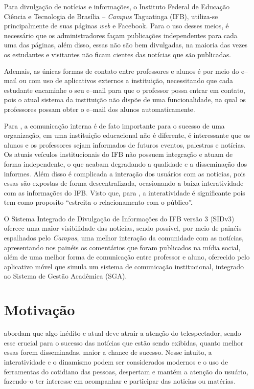 Para divulgação de notícias e informações, o Instituto Federal de Educação Ciência e Tecnologia de Brasília -- \textit{Campus} Taguatinga (IFB), utiliza-se principalmente de suas páginas \textit{web} e Facebook. Para o uso desses meios, é necessário que os administradores façam publicações independentes para cada uma das páginas, além disso, essas não são bem divulgadas, na maioria das vezes os estudantes e visitantes não ficam cientes das notícias que são publicadas. 

Ademais, as únicas formas de contato entre professores e alunos é por meio do e--mail ou com uso de aplicativos externos a instituição, necessitando que cada estudante encaminhe o seu e--mail para que o professor possa entrar em contato, pois o atual sistema da instituição não dispõe de uma funcionalidade, na qual os professores possam obter o e--mail dos alunos automaticamente.

Para \citet{pinheiro2010}, a comunicação interna é de fato importante para o sucesso de uma organização, em uma instituição educacional não é diferente, é interessante que os alunos e os professores sejam informados de futuros eventos, palestras e notícias. Os atuais veículos institucionais do IFB não possuem integração e atuam de forma independente, o que acabam degradando a qualidade e a disseminação dos informes. Além disso é complicada a interação dos usuários com as noticias, pois essas são expostas de forma descentralizada, ocasionando a baixa interatividade com as informações do IFB. Visto que, para \citet{santos2014}, a interatividade  é significante pois tem como proposito ``estreita o relacionamento com o público''.

O Sistema Integrado de Divulgação de Informações do IFB versão 3 (SIDv3) oferece uma maior visibilidade das notícias, sendo possível, por meio de painéis espalhados pelo \textit{Campus}, uma melhor interação da comunidade com as notícias, apresentando nos painéis os comentários que foram publicados na mídia social, além de uma melhor forma de comunicação entre professor e aluno, oferecido pelo aplicativo móvel que simula um sistema de comunicação institucional, integrado ao Sistema de Gestão Acadêmica (SGA).

\section{Motivação}
\citet{bianchi2006} abordam que algo inédito e atual deve atrair a atenção do telespectador, sendo esse crucial para o sucesso das notícias que estão sendo exibidas, quanto melhor essas forem disseminadas, maior a chance de sucesso. Nesse intuito, a interatividade e o dinamismo podem ser considerados modernos e o uso de ferramentas do cotidiano das pessoas, despertam e mantém a atenção do usuário, fazendo--o ter interesse em acompanhar e participar das noticias ou matérias.

